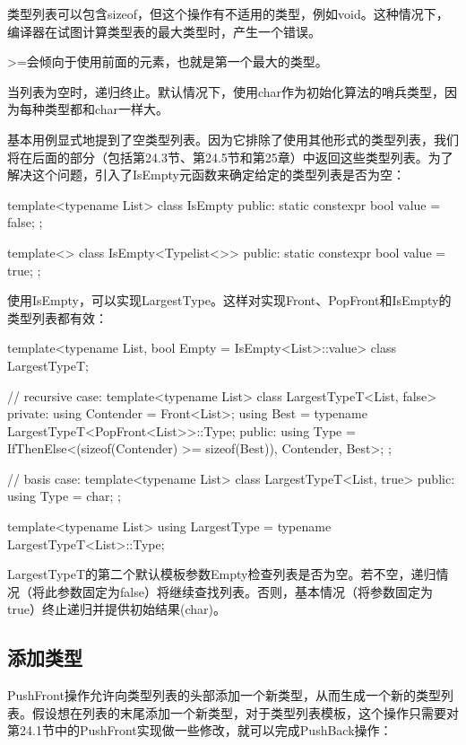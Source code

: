 \begin{notice}
类型列表可以包含sizeof，但这个操作有不适用的类型，例如void。这种情况下，编译器在试图计算类型表的最大类型时，产生一个错误。
\end{notice}

>=会倾向于使用前面的元素，也就是第一个最大的类型。

当列表为空时，递归终止。默认情况下，使用char作为初始化算法的哨兵类型，因为每种类型都和char一样大。

基本用例显式地提到了空类型列表。因为它排除了使用其他形式的类型列表，我们将在后面的部分（包括第24.3节、第24.5节和第25章）中返回这些类型列表。为了解决这个问题，引入了IsEmpty元函数来确定给定的类型列表是否为空：

\begin{cpp}
template<typename List>
class IsEmpty
{
	public:
	static constexpr bool value = false;
};

template<>
class IsEmpty<Typelist<>> {
	public:
	static constexpr bool value = true;
};
\end{cpp}

使用IsEmpty，可以实现LargestType。这样对实现Front、PopFront和IsEmpty的类型列表都有效：

\begin{cpp}
template<typename List, bool Empty = IsEmpty<List>::value>
class LargestTypeT;

// recursive case:
template<typename List>
class LargestTypeT<List, false>
{
	private:
	using Contender = Front<List>;
	using Best = typename LargestTypeT<PopFront<List>>::Type;
	public:
	using Type = IfThenElse<(sizeof(Contender) >= sizeof(Best)),
	Contender, Best>;
};

// basis case:
template<typename List>
class LargestTypeT<List, true>
{
	public:
	using Type = char;
};

template<typename List>
using LargestType = typename LargestTypeT<List>::Type;
\end{cpp}

LargestTypeT的第二个默认模板参数Empty检查列表是否为空。若不空，递归情况（将此参数固定为false）将继续查找列表。否则，基本情况（将参数固定为true）终止递归并提供初始结果(char)。

\subsection{添加类型}

PushFront操作允许向类型列表的头部添加一个新类型，从而生成一个新的类型列表。假设想在列表的末尾添加一个新类型，对于类型列表模板，这个操作只需要对第24.1节中的PushFront实现做一些修改，就可以完成PushBack操作：

